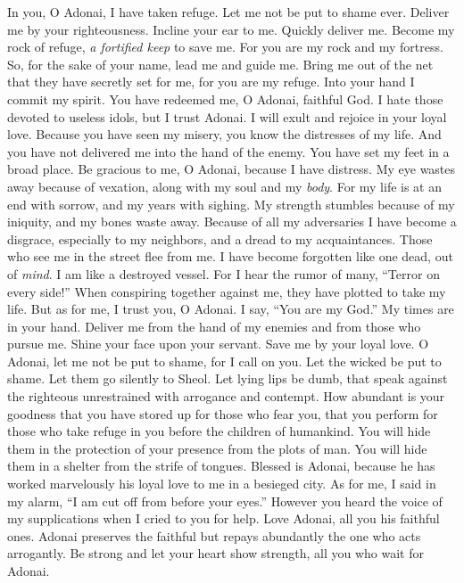 \begin{biblechapter} %
 In you, O Adonai, I have taken refuge. 
Let me not be put to shame ever. 
Deliver me by your righteousness.
\verse Incline your ear to me. 
Quickly deliver me. 
Become my rock of refuge, 
\textit{a fortified keep} to save me.
\verse For you are my rock and my fortress. 
So, for the sake of your name, 
lead me and guide me.
\verse Bring me out of the net that they have secretly set for me, 
for you are my refuge.
\verse Into your hand I commit my spirit. 
You have redeemed me, O Adonai, faithful God.
\verse I hate those devoted to useless idols, 
but I trust Adonai.
\verse I will exult and rejoice in your loyal love. 
Because you have seen my misery, 
you know the distresses of my life.
\verse And you have not delivered me 
into the hand of the enemy. 
You have set my feet in a broad place.
\verse Be gracious to me, O Adonai, 
because I have distress. 
My eye wastes away because of vexation, 
along with my soul and my \textit{body}.
\verse For my life is at an end with sorrow, 
and my years with sighing. 
My strength stumbles because of my iniquity, 
and my bones waste away.
\verse Because of all my adversaries I have become a disgrace, 
especially to my neighbors, 
and a dread to my acquaintances. 
Those who see me in the street flee from me.
\verse I have become forgotten like one dead, out of \textit{mind}. 
I am like a destroyed vessel.
\verse For I hear the rumor of many, 
“Terror on every side!” 
When conspiring together against me, 
they have plotted to take my life.
\verse But as for me, I trust you, O Adonai. 
I say, “You are my God.”
\verse My times are in your hand. 
Deliver me from the hand of my enemies 
and from those who pursue me.
\verse Shine your face upon your servant. 
Save me by your loyal love.
\verse O Adonai, let me not be put to shame, for I call on you. 
Let the wicked be put to shame. 
Let them go silently to Sheol.
\verse Let lying lips be dumb, 
that speak against the righteous unrestrained 
with arrogance and contempt.
\verse How abundant is your goodness 
that you have stored up for those who fear you, 
that you perform for those who take refuge in you 
before the children of humankind.
\verse You will hide them in the protection of your presence 
from the plots of man. 
You will hide them in a shelter from the strife of tongues.
\verse Blessed is Adonai, 
because he has worked marvelously his loyal love to me 
in a besieged city.
\verse As for me, I said in my alarm, 
“I am cut off from before your eyes.” 
However you heard the voice of my supplications 
when I cried to you for help.
\verse Love Adonai, all you his faithful ones. 
Adonai preserves the faithful 
but repays abundantly the one who acts arrogantly.
\verse Be strong and let your heart show strength, 
all you who wait for Adonai.
\end{biblechapter}

